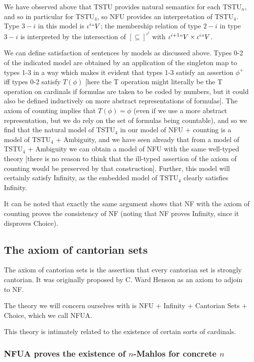 \documentclass[12pt]{article}
\begin{document}
We have observed above that TSTU provides natural semantics for each TSTU$_n$, and so in particular for TSTU$_4$, so NFU provides an interpretation of TSTU$_4$.  Type $3-i$ in this model is $\iota^i``V$; the membership relation
of type $2-i$ in type $3-i$ is interpreted by the intersection of $[\subseteq]^{\iota^i}$ with $\iota^{i+1}``V \times \iota^i``V$.

We can define satisfaction of sentences by models as discussed above.  Types 0-2 of the indicated model are obtained by an application of the singleton map to types 1-3 in a way which makes it evident that types 1-3 satisfy an assertion $\phi^+$ iff
types 0-2 satisfy $T(\phi)$ [here the T operation might literally be the T operation on cardinals if formulas are taken to be coded by numbers, but it could also be defined inductively on more abstract representations of formulas].
The axiom of counting implies that $T(\phi) = \phi$ (even if we use a more abstract representation, but we do rely on the set of formulas being countable), and so we find that the natural model of TSTU$_4$ in our model of NFU + counting is a model of TSTU$_4$ + Ambiguity, and we have
seen already that from a model of TSTU$_4$ + Ambiguity we can obtain a model of NFU with the same well-typed theory [there is no reason to think that the ill-typed assertion of the axiom of counting would be preserved by that construction].  Further, this model will certainly satisfy Infinity, as the embedded model of TSTU$_4$ clearly satisfies Infinity.

It can be noted that exactly the same argument shows that NF with the axiom of counting proves the consistency of NF (noting that NF proves Infinity, since it disproves Choice).

\subsection{The axiom of cantorian sets}

The axiom of cantorian sets is the assertion that every cantorian set is strongly cantorian.  It was originally proposed by C. Ward Henson as an axiom to adjoin to NF.

The theory we will concern ourselves with is NFU + Infinity + Cantorian Sets + Choice, which we call NFUA.

This theory is intimately related to the existence of certain sorts of cardinals.

\subsubsection{NFUA proves the existence of $n$-Mahlos for concrete $n$}
\end{document}

